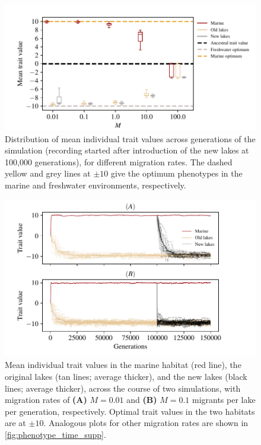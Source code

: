 \documentclass{article}
\begin{document}
\begin{figure}
    \begin{center}
          \includegraphics{Final_Plots/Pheno_Dist.pdf}
          \caption{
            Distribution of mean individual trait values across generations of the simulation 
            (recording started after introduction of the new lakes at 100,000 generations),
            for different migration rates.
            The dashed yellow and grey lines at $\pm 10$ give the optimum phenotypes
            in the marine and freshwater environments, respectively.
        }
          \label{fig:MeanPhenotype}
    \end{center}
\end{figure}

\begin{figure}
    \begin{center}
        \includegraphics{Final_Plots/Pheno_Time.pdf}
          \caption{ 
        Mean individual trait values in the marine habitat (red line),
                the original lakes (tan lines; average thicker),
                and the new lakes (black lines; average thicker),
                across the course of two simulations, with migration rates of
                \textbf{(A)} $M=0.01$ and
                \textbf{(B)} $M=0.1$ 
                migrants per lake per generation, respectively.
                Optimal trait values in the two habitats are at $\pm 10$.
                    Analogous plots for other migration rates
                    are shown in \autoref{fig:phenotype_time_supp}.
        }
          \label{fig:phenotype_time}
    \end{center}
\end{figure}
\end{document}
